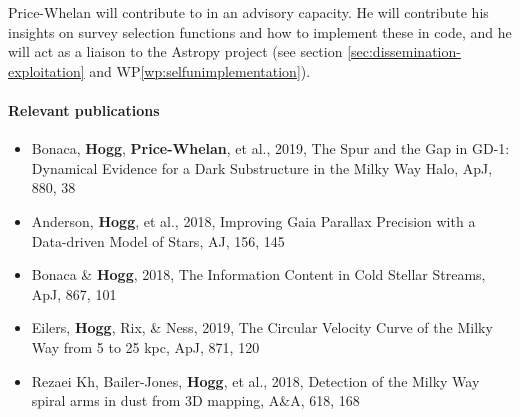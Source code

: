 Price-Whelan will contribute to {\acro} in an advisory capacity. He will contribute his insights on survey selection functions and how to implement these in code, and he will act as a liaison to the Astropy project (see section \ref{sec:dissemination-exploitation} and WP\ref{wp:selfunimplementation}).

\paragraph{Relevant publications}
\begin{itemize}
    \item Bonaca, \textbf{Hogg}, \textbf{Price-Whelan}, et al., 2019, The Spur and the Gap in GD-1: Dynamical Evidence for a Dark Substructure in the Milky Way Halo, ApJ, 880, 38
    \item Anderson, \textbf{Hogg}, et al., 2018, Improving Gaia Parallax Precision with a Data-driven Model of Stars, AJ, 156, 145
    \item Bonaca \& \textbf{Hogg}, 2018, The Information Content in Cold Stellar Streams, ApJ, 867, 101
    \item Eilers, \textbf{Hogg}, Rix, \& Ness, 2019, The Circular Velocity Curve of the Milky Way from 5 to 25 kpc, ApJ, 871, 120
    \item Rezaei Kh, Bailer-Jones, \textbf{Hogg}, et al., 2018, Detection of the Milky Way spiral arms in dust from 3D mapping, A\&A, 618, 168
\end{itemize}

